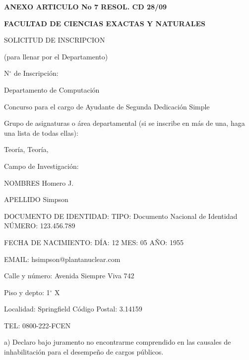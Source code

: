 \documentclass{article}
\newcommand{\cargo}[1]{\noindent Concurso para el cargo de {#1} \hspace{0.5cm} Dedicaci\'on Simple}
\newcommand{\areas}[3]{\noindent Grupo de asignaturas o \'area departamental (si se inscribe en m\'as de una, haga una lista de todas ellas):

\medskip

\noindent {#1}\def\temp{#2}\ifx\temp\empty \else, {#2}\fi\def\temp{#3}\ifx\temp\empty \else, {#3} \fi}
\newcommand{\apellido}[1]{\noindent APELLIDO {#1}}
\newcommand{\nombre}[1]{\noindent NOMBRES {#1}}
\newcommand{\dni}[1]{\noindent DOCUMENTO DE IDENTIDAD:  TIPO: Documento Nacional de Identidad \hspace{0.25cm} N\'UMERO: {#1}}
\newcommand{\fechaNacimiento}[3]{\noindent FECHA DE NACIMIENTO: D\'IA: {#1} \hspace{0.1cm} MES: {#2} {\hspace{0.1cm}} A\~NO: {#3}}
\newcommand{\domicilio}[5]{\noindent Calle y n\'umero: {#1}

\noindent Piso y depto: {#2}

\noindent Localidad: {#3} {\hspace{3cm}} C\'odigo Postal: {#4}

\noindent TEL: {#5}
}
\newcommand{\email}[1]{\noindent EMAIL: {#1}}
\newcommand{\legajo}[1]{\noindent N\'UMERO DE LEGAJO : {#1}}
\begin{document}
\begin{center}
{\bf ANEXO ARTICULO No 7 RESOL. CD 28/09}
\end{center}
{\bf \noindent FACULTAD DE CIENCIAS EXACTAS Y NATURALES

\noindent SOLICITUD DE INSCRIPCION}

\bigskip

\noindent (para llenar por el Departamento) 

\bigskip

\noindent N$^\circ$ de Inscripci\'on: \hdashrule{4cm}{0.5pt}{0.75pt} 

\medskip

\noindent Departamento de Computaci\'on

\cargo{Ayudante de Segunda}

\areas{Algoritmos}{Teor\'ia}{}

\medskip

\noindent \hdashrule{\linewidth}{0.5pt}{0.75pt}

\noindent Campo de Investigación:

\medskip

\noindent \hdashrule{\linewidth}{0.5pt}{0.75pt}

\medskip

\noindent \hdashrule{\linewidth}{0.5pt}{0.75pt}

\medskip

\noindent \hrulefill

\bigskip

\nombre{Homero J.}

\medskip

\apellido{Simpson}

\medskip

\dni{123.456.789}

\medskip

\fechaNacimiento{12}{05}{1955}

\medskip

\email{hsimpson@plantanuclear.com}

% 

\bigskip

\domicilio{Avenida Siempre Viva 742}{1$^\circ$ X}{Springfield}{3.14159}{0800-222-FCEN}

\bigskip
\bigskip
\bigskip
\bigskip


\noindent a) Declaro bajo juramento no encontrarme comprendido en las causales de inhabilitaci\'on para el desempe\~no de cargos p\'ublicos.
\end{document}
